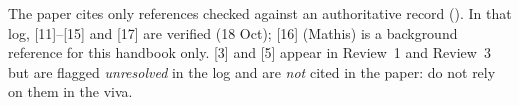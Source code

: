 \endgroup
\noindent The paper cites only references checked against an authoritative record (). In that log, [11]--[15] and [17] are verified (18 Oct); [16] (Mathis) is a background reference for this handbook only. [3] and [5] appear in Review~1 and Review~3 but are flagged \emph{unresolved} in the log and are \emph{not} cited in the paper: do not rely on them in the viva.
